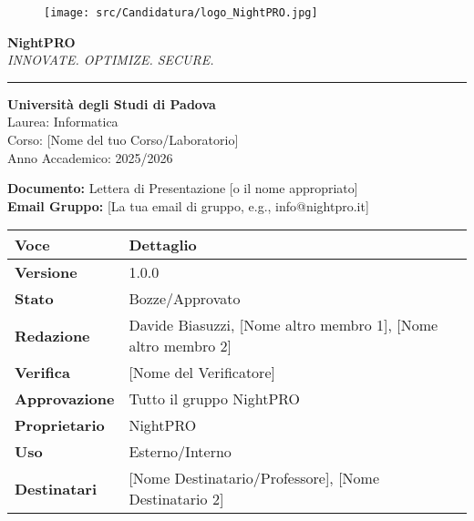 \documentclass[12pt, a4paper]{article}
\title{} %
\author{} %
\begin{document}

\begin{figure}[h]
    \centering
    \texttt{[image: src/Candidatura/logo\_NightPRO.jpg]} %
\end{figure}

\begin{center}
    \textbf{\Large NightPRO} \\
    \textit{INNOVATE. OPTIMIZE. SECURE.} \\
    \vspace{0.5cm}
    \rule{\linewidth}{0.8pt} %
    \vspace{0.5cm}
    
    \textbf{Università degli Studi di Padova} \\
    Laurea: Informatica \\
    Corso: [Nome del tuo Corso/Laboratorio] \\ %
    Anno Accademico: 2025/2026 \\
    \vspace{0.5cm}
    
    \textbf{Documento:} Lettera di Presentazione [o il nome appropriato] \\
    \textbf{Email Gruppo:} [La tua email di gruppo, e.g., info@nightpro.it] \\
\end{center}

\vspace{1cm}

\begin{longtable}{|p{2.5cm}|p{8cm}|}
    \hline
    \textbf{Voce} & \textbf{Dettaglio} \\
    \hline
    \endhead %
    
    \hline
    \textbf{Versione} & 1.0.0 \\
    \hline
    \textbf{Stato} & Bozze/Approvato \\
    \hline
    \textbf{Redazione} & Davide Biasuzzi, [Nome altro membro 1], [Nome altro membro 2] \\
    \hline
    \textbf{Verifica} & [Nome del Verificatore] \\
    \hline
    \textbf{Approvazione} & Tutto il gruppo NightPRO \\
    \hline
    \textbf{Proprietario} & NightPRO \\
    \hline
    \textbf{Uso} & Esterno/Interno \\
    \hline
    \textbf{Destinatari} & [Nome Destinatario/Professore], [Nome Destinatario 2] \\
    \hline
\end{longtable}
\end{document}
